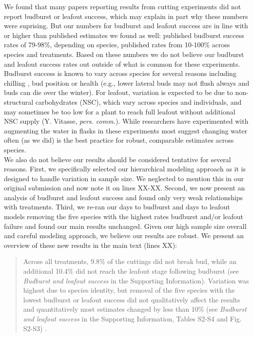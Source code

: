 \documentclass[11pt,a4paper]{article}
\begin{document}
We found that many papers reporting results from cutting experiments did not report budburst or leafout success, which may explain in part why these numbers were suprising. But our numbers for budburst and leafout success are in line with or higher than published estimates we found as well: \citet{Basler:2012aa} published budburst success rates of 79-98\%, depending on species, \citet{laube2014gcb} published rates from 10-100\% across species and treatments. Based on these numbers we do not believe our budburst and leafout success rates out outside of what is common for these experiments.\\

Budburst success is known to vary across species for several reasons including chilling \citep{laube2014gcb}, bud position or health (e.g., lower lateral buds may not flush always and buds can die over the winter). For leafout, variation is expected to be due to non-structural carbohydrates (NSC), which vary across species and individuals, and may sometimes be too low for a plant to reach full leafout without additional NSC supply (Y. Vitasse, \emph{pers. comm.}). While researchers have experimented with augmenting the water in flasks in these experiments most suggest changing water often (as we did) is the best practice for robust, comparable estimates across species.\\

We also do not believe our results should be considered tentative for several reasons. First, we specifically selected our hierarchical modeling approach as it is designed to handle variation in sample size. We neglected to mention this in our original submission and now note it on lines XX-XX. Second, we now present an analysis of budburst and leafout success and found only very weak relationships with treatments. Third, we re-ran our days to budburst and days to leafout models removing the five species with the highest rates budburst and/or leafout failure and found our main results unchanged. Given our high sample size overall and careful modeling approach, we believe our results are robust. We present an overview of these new results in the main text (lines XX):

\begin{quote}
Across all treatments, 9.8\% of the cuttings did not break bud, while an additional 10.4\% did not reach the leafout stage following budburst (see \emph{Budburst and leafout success} in the Supporting Information). Variation was highest due to species identity, but removal of the five species with the lowest  budburst or leafout success did not qualitatively affect the results and quantitatively most estimates changed by less than 10\% (see \emph{Budburst and leafout success} in the Supporting Information, Tables S2-S4 and Fig. S2-S3) . 
\end{quote}
\end{document}
